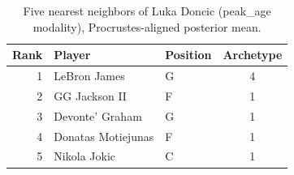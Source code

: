 \begin{table}[htbp]
  \centering\small
  \begin{tabular}{rllc}
    \toprule
    Rank & Player & Position & Archetype \\
    \midrule
    1 & LeBron James & G & 4 \\
    2 & GG Jackson II & F & 1 \\
    3 & Devonte' Graham & G & 1 \\
    4 & Donatas Motiejunas & F & 1 \\
    5 & Nikola Jokic & C & 1 \\
    \bottomrule
  \end{tabular}
  \caption{Five nearest neighbors of Luka Doncic (peak_age modality), Procrustes-aligned posterior mean.}
  \label{tab:Luka_Doncic_neighbors_peak_age}
\end{table}

